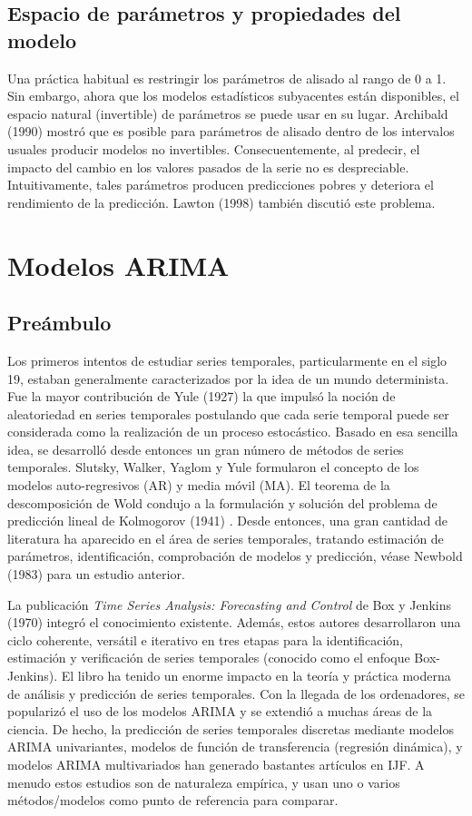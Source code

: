 \documentclass{llncs}
\begin{document}
\subsection{Espacio de parámetros y propiedades del modelo}
Una práctica habitual es restringir los parámetros de alisado al rango de 0 a 1. Sin embargo, ahora que los modelos estadísticos subyacentes están disponibles, el espacio natural (invertible) de parámetros se puede usar en su lugar. Archibald (1990) \cite{Archibald1990199} mostró que es posible para parámetros de alisado dentro de los intervalos usuales producir modelos no invertibles. Consecuentemente, al predecir, el impacto del cambio en los valores pasados de la serie no es despreciable. Intuitivamente, tales parámetros producen predicciones pobres y deteriora el rendimiento de la predicción. Lawton (1998) \cite{Lawton1998393} también discutió este problema.

\section{Modelos ARIMA}
\subsection{Preámbulo}
Los primeros intentos de estudiar series temporales, particularmente en el siglo 19, estaban generalmente caracterizados por la idea de un mundo determinista. Fue la mayor contribución de Yule (1927) \cite{Yule1927267} la que impulsó la noción de aleatoriedad en series temporales postulando que cada serie temporal puede ser considerada como la realización de un proceso estocástico. Basado en esa sencilla idea, se desarrolló desde entonces un gran número de métodos de series temporales. Slutsky, Walker, Yaglom y Yule formularon el concepto de los modelos auto-regresivos (AR) y media móvil (MA). El teorema de la descomposición de Wold condujo a la formulación y solución del problema de predicción lineal de Kolmogorov (1941) \cite{Kolmogorov19411}. Desde entonces, una gran cantidad de literatura ha aparecido en el área de series temporales, tratando estimación de parámetros, identificación, comprobación de modelos y predicción, véase Newbold (1983) \cite{Newbold198323} para un estudio anterior.

La publicación \emph{Time Series Analysis: Forecasting and Control} de Box y Jenkins (1970) \cite{Box1976} integró el conocimiento existente. Además, estos autores desarrollaron una ciclo coherente, versátil e iterativo en tres etapas para la identificación, estimación y verificación de series temporales (conocido como el enfoque Box-Jenkins). El libro ha tenido un enorme impacto en la teoría y práctica moderna de análisis y predicción de series temporales. Con la llegada de los ordenadores, se popularizó el uso de los modelos ARIMA y se extendió a muchas áreas de la ciencia. De hecho, la predicción de series temporales discretas mediante modelos ARIMA univariantes, modelos de función de transferencia (regresión dinámica), y modelos ARIMA multivariados han generado bastantes artículos en IJF. A menudo estos estudios son de naturaleza empírica, y usan uno o varios métodos/modelos como punto de referencia para comparar. 
\end{document}
